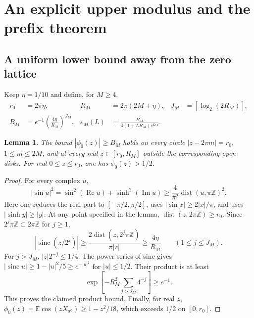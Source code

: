 \documentclass[11pt,a4paper]{article}
\numberwithin{equation}{section}
\newtheorem{lemma}[theorem]{Lemma}
\theoremstyle{definition}
\theoremstyle{remark}
\DeclareMathOperator{\sinc}{sinc}
\newcommand{\E}{\mathbb E}
\newcommand{\eps}{\varepsilon}
\begin{document}
\section{An explicit upper modulus and the prefix theorem}
\label{sec:upper}

\subsection{A uniform lower bound away from the zero lattice}

Keep $\eta=1/10$ and define, for $M\ge4$,
\begin{align}
 r_0&=2\pi\eta,& R_M&=2\pi(2M+\eta),
 &J_M&=\left\lceil\log_2(2R_M)\right\rceil,\\
 B_M&=e^{-1}\left(\frac{4\eta}{R_M}\right)^{J_M},
 &\eps_M(L)&=\frac{B_M}{4(1+LR_M)e^{Lr_0}}.
 \label{eq:thresholds}
\end{align}

\begin{lemma}\label{lem:lower-contour}
The bound $|\phi_0(z)|\ge B_M$ holds on every circle
$|z-2\pi m|=r_0$, $1\le m\le2M$, and at every real
$z\in[r_0,R_M]$ outside the corresponding open disks.
For real $0\le z\le r_0$, one has $\phi_0(z)>1/2$.
\end{lemma}
\begin{proof}
For every complex $u$,
\[
 |\sin u|^2=\sin^2(\operatorname{Re}u)+\sinh^2(\operatorname{Im}u)
 \ge\frac4{\pi^2}\operatorname{dist}(u,\pi\mathbb Z)^2.
\]
Here one reduces the real part to $[-\pi/2,\pi/2]$, uses
$|\sin x|\ge2|x|/\pi$, and uses $|\sinh y|\ge|y|$.
At any point specified in the lemma,
$\operatorname{dist}(z,2\pi\mathbb Z)\ge r_0$.
Since $2^j\pi\mathbb Z\subset2\pi\mathbb Z$ for $j\ge1$,
\[
 |\sinc(z/2^j)|
 \ge\frac{2\operatorname{dist}(z,2^j\pi\mathbb Z)}{\pi|z|}
 \ge\frac{4\eta}{R_M}\qquad(1\le j\le J_M).
\]
For $j>J_M$, $|z|2^{-j}\le1/4$. The power series of sinc gives
$|\sinc u|\ge1-|u|^2/5\ge e^{-|u|^2}$ for $|u|\le1/2$.
Their product is at least
\[
 \exp\left[-R_M^2\sum_{j>J_M}4^{-j}\right]\ge e^{-1}.
\]
This proves the claimed product bound. Finally, for real $z$,
$\phi_0(z)=\E\cos(zX_{a^0})\ge1-z^2/18$, which exceeds $1/2$ on
$[0,r_0]$.
\end{proof}
\end{document}
